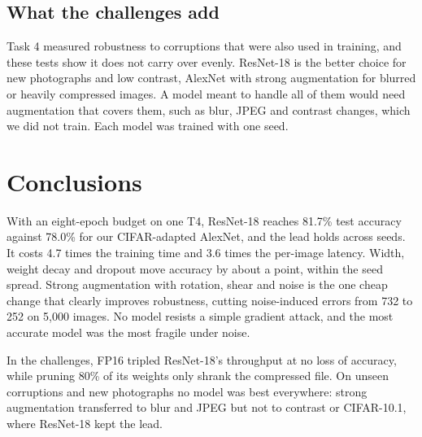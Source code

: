 \documentclass[11pt,a4paper]{article}
\begin{document}
\subsection{What the challenges add}
Task 4 measured robustness to corruptions that were also used in training, and these tests show it does not carry over evenly. ResNet-18 is the better choice for new photographs and low contrast, AlexNet with strong augmentation for blurred or heavily compressed images. A model meant to handle all of them would need augmentation that covers them, such as blur, JPEG and contrast changes, which we did not train. Each model was trained with one seed.

\section{Conclusions}
With an eight-epoch budget on one T4, ResNet-18 reaches 81.7\% test accuracy against 78.0\% for our CIFAR-adapted AlexNet, and the lead holds across seeds. It costs 4.7 times the training time and 3.6 times the per-image latency. Width, weight decay and dropout move accuracy by about a point, within the seed spread. Strong augmentation with rotation, shear and noise is the one cheap change that clearly improves robustness, cutting noise-induced errors from 732 to 252 on 5,000 images. No model resists a simple gradient attack, and the most accurate model was the most fragile under noise.

In the challenges, FP16 tripled ResNet-18's throughput at no loss of accuracy, while pruning 80\% of its weights only shrank the compressed file. On unseen corruptions and new photographs no model was best everywhere: strong augmentation transferred to blur and JPEG but not to contrast or CIFAR-10.1, where ResNet-18 kept the lead.
\end{document}
